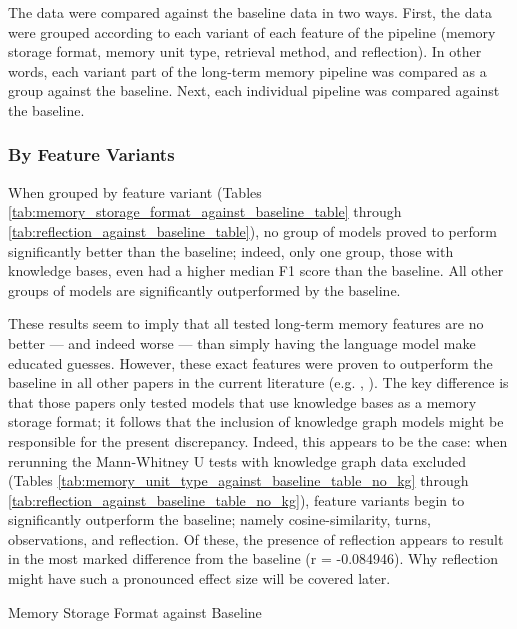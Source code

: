 The data were compared against the baseline data in two ways. First, the data were grouped according to each variant of each feature of the pipeline (memory storage format, memory unit type, retrieval method, and reflection). In other words, each variant part of the long-term memory pipeline was compared as a group against the baseline. Next, each individual pipeline was compared against the baseline.


\subsubsection{By Feature Variants}

When grouped by feature variant (Tables \ref{tab:memory_storage_format_against_baseline_table} through \ref{tab:reflection_against_baseline_table}), no group of models proved to perform significantly better than the baseline; indeed, only one group, those with knowledge bases, even had a higher median F1 score than the baseline. All other groups of models are significantly outperformed by the baseline. 

These results seem to imply that all tested long-term memory features are no better — and indeed worse — than simply having the language model make educated guesses. However, these exact features were proven to outperform the baseline in all other papers in the current literature (e.g. \cite{Maharana2024}, \cite{Li2024}). The key difference is that those papers only tested models that use knowledge bases as a memory storage format; it follows that the inclusion of knowledge graph models might be responsible for the present discrepancy. Indeed, this appears to be the case: when rerunning the Mann-Whitney U tests with knowledge graph data excluded (Tables \ref{tab:memory_unit_type_against_baseline_table_no_kg} through \ref{tab:reflection_against_baseline_table_no_kg}), feature variants begin to significantly outperform the baseline; namely cosine-similarity, turns, observations, and reflection. Of these, the presence of reflection appears to result in the most marked difference from the baseline (r = -0.084946). Why reflection might have such a pronounced effect size will be covered later.

\begin{table}[p]
\centering
\tiny

\caption{Memory Storage Format against Baseline}
\label{tab:memory_storage_format_against_baseline_table}
\end{table}

